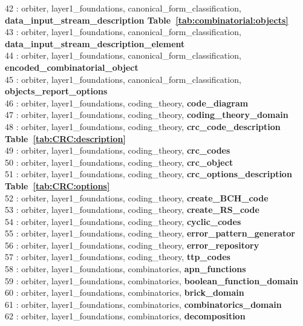  42 : orbiter, layer1\_foundations, canonical\_form\_classification, {\bf data\_input\_stream\_description Table~\ref{tab:combinatorial:objects}}\\
 43 : orbiter, layer1\_foundations, canonical\_form\_classification, {\bf data\_input\_stream\_description\_element}\\
 44 : orbiter, layer1\_foundations, canonical\_form\_classification, {\bf encoded\_combinatorial\_object}\\
 45 : orbiter, layer1\_foundations, canonical\_form\_classification, {\bf objects\_report\_options}\\
 46 : orbiter, layer1\_foundations, coding\_theory, {\bf code\_diagram}\\
 47 : orbiter, layer1\_foundations, coding\_theory, {\bf coding\_theory\_domain}\\
 48 : orbiter, layer1\_foundations, coding\_theory, {\bf crc\_code\_description Table~\ref{tab:CRC:description}}\\
 49 : orbiter, layer1\_foundations, coding\_theory, {\bf crc\_codes}\\
 50 : orbiter, layer1\_foundations, coding\_theory, {\bf crc\_object}\\
 51 : orbiter, layer1\_foundations, coding\_theory, {\bf crc\_options\_description Table~\ref{tab:CRC:options}}\\
 52 : orbiter, layer1\_foundations, coding\_theory, {\bf create\_BCH\_code}\\
 53 : orbiter, layer1\_foundations, coding\_theory, {\bf create\_RS\_code}\\
 54 : orbiter, layer1\_foundations, coding\_theory, {\bf cyclic\_codes}\\
 55 : orbiter, layer1\_foundations, coding\_theory, {\bf error\_pattern\_generator}\\
 56 : orbiter, layer1\_foundations, coding\_theory, {\bf error\_repository}\\
 57 : orbiter, layer1\_foundations, coding\_theory, {\bf ttp\_codes}\\
 58 : orbiter, layer1\_foundations, combinatorics, {\bf apn\_functions}\\
 59 : orbiter, layer1\_foundations, combinatorics, {\bf boolean\_function\_domain}\\
 60 : orbiter, layer1\_foundations, combinatorics, {\bf brick\_domain}\\
 61 : orbiter, layer1\_foundations, combinatorics, {\bf combinatorics\_domain}\\
 62 : orbiter, layer1\_foundations, combinatorics, {\bf decomposition}\\
